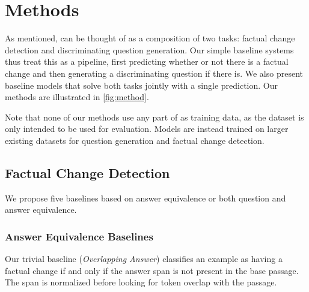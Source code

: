 \section{Methods}\label{sec:methods}
As mentioned, \dataset{} can be thought of as a composition of two tasks: factual change detection and discriminating question generation.
Our simple baseline systems thus treat this as a pipeline, first predicting whether or not there is a factual change and then generating a discriminating question if there is. We also present baseline models that solve both tasks jointly with a single prediction. 
Our methods are illustrated in \autoref{fig:method}.



Note that none of our methods use any part of \dataset{} as training data, as the dataset is only intended to be used for evaluation. Models are instead trained on larger existing datasets for question generation and factual change detection. 


\subsection{Factual Change Detection}\label{subsec:fact}
We propose five baselines based on answer equivalence or both question and answer equivalence. 

\subsubsection*{Answer Equivalence Baselines}
\label{Method:Overlap}
Our trivial baseline (\textit{Overlapping Answer}) classifies an example as having a factual change if and only if the answer span is not present in the base passage. The span is normalized before looking for token overlap with the passage. 

